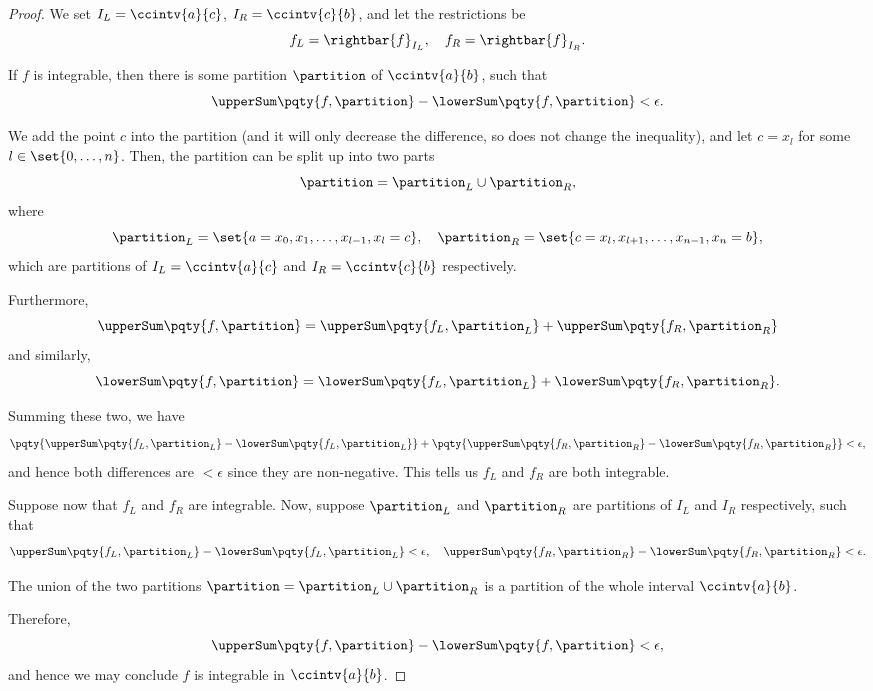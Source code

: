 \begin{proof}
    We set \(I_L = \ccintv{a}{c}\), \(I_R = \ccintv{c}{b}\), and let the restrictions be
    \[
        f_L = \rightbar{f}_{I_L}, \quad f_R = \rightbar{f}_{I_R}.
    \]

    If \(f\) is integrable, then there is some partition \(\partition\) of \(\ccintv{a}{b}\), such that
    \[
        \upperSum\pqty{f, \partition} - \lowerSum\pqty{f, \partition} < \epsilon.
    \]

    We add the point \(c\) into the partition (and it will only decrease the difference, so does not change the inequality), and let \(c = x_l\) for some \(l \in \set{0, \ldots, n}\). Then, the partition can be split up into two parts
    \[
        \partition = \partition_L \cup \partition_R,
    \]
    where
    \[
        \partition_L = \set{a = x_0, x_1, \ldots, x_{l - 1}, x_l = c}, \quad \partition_R = \set{c = x_l, x_{l + 1}, \ldots, x_{n - 1}, x_n = b},
    \]
    which are partitions of \(I_L = \ccintv{a}{c}\) and \(I_R = \ccintv{c}{b}\) respectively.
    
    Furthermore,
    \[
        \upperSum\pqty{f, \partition} = \upperSum\pqty{f_L, \partition_L} + \upperSum\pqty{f_R, \partition_R}
    \]
    and similarly,
    \[
        \lowerSum\pqty{f, \partition} = \lowerSum\pqty{f_L, \partition_L} + \lowerSum\pqty{f_R, \partition_R}.
    \]

    Summing these two, we have
    \[
        \pqty{\upperSum\pqty{f_L, \partition_L} - \lowerSum\pqty{f_L, \partition_L}} + \pqty{\upperSum\pqty{f_R, \partition_R} - \lowerSum\pqty{f_R, \partition_R}} < \epsilon,
    \]
    and hence both differences are \(< \epsilon\) since they are non-negative. This tells us \(f_L\) and \(f_R\) are both integrable.

    Suppose now that \(f_L\) and \(f_R\) are integrable. Now, suppose \(\partition_L\) and \(\partition_R\) are partitions of \(I_L\) and \(I_R\) respectively, such that
    \[
        \upperSum\pqty{f_L, \partition_L} - \lowerSum\pqty{f_L, \partition_L} < \epsilon, \quad \upperSum\pqty{f_R, \partition_R} - \lowerSum\pqty{f_R, \partition_R} < \epsilon.
    \]

    The union of the two partitions \(\partition = \partition_L \cup \partition_R\) is a partition of the whole interval \(\ccintv{a}{b}\).

    Therefore,
    \[
        \upperSum\pqty{f, \partition} - \lowerSum\pqty{f, \partition} < \epsilon,
    \]
    and hence we may conclude \(f\) is integrable in \(\ccintv{a}{b}\).


\end{proof}
